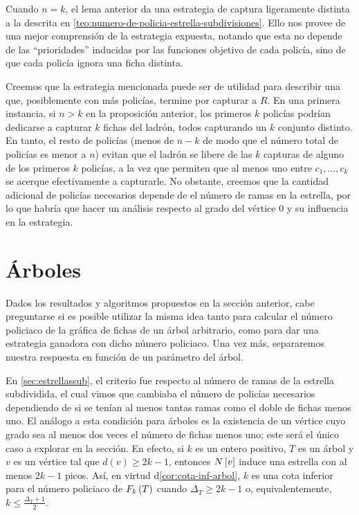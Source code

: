 Cuando $n=k$, el lema anterior da una estrategia de captura ligeramente distinta
a la descrita en \cref{teo:numero-de-policia-estrella-subdivisiones}. Ello nos
provee de una mejor comprensi\'on de la estrategia expuesta, notando que esta no
depende de las ``prioridades'' inducidas por las funciones objetivo de cada
polic\'ia, sino de que cada polic\'ia ignora una ficha distinta.

Creemos que la estrategia mencionada puede ser de utilidad para describir una
que, posiblemente con m\'as polic\'ias, termine por capturar a $R$. En una
primera instancia, si $n>k$ en la proposici\'on anterior, los primeros $k$
polic\'ias podr\'ian dedicarse a capturar $k$ fichas del ladr\'on, todos
capturando un $k$ conjunto distinto. En tanto, el resto de polic\'ias (menos de
$n-k$ de modo que el n\'umero total de polic\'ias es menor a $n$) evitan que el
ladr\'on se libere de las $k$ capturas de alguno de los primeros $k$ polic\'ias,
a la vez que permiten que al menos uno entre $c_1,\dots, c_k$ se acerque
efectivamente a capturarle. No obstante, creemos que la cantidad adicional de
polic\'ias necesarios depende de el n\'umero de ramas en la estrella, por lo que
habr\'ia que hacer un an\'alisis respecto al grado del v\'ertice $0$ y su
influencia en la estrategia.

\section{\'Arboles}
\label{sec:arboles}

Dados los resultados y algoritmos propuestos en la secci\'on anterior, cabe
preguntarse si es posible utilizar la misma idea tanto para calcular el n\'umero
policiaco de la gr\'afica de fichas de un \'arbol arbitrario, como para dar una
estrategia ganadora con dicho n\'umero policiaco. Una vez m\'as, separaremos
nuestra respuesta en funci\'on de un par\'ametro del \'arbol.

En \cref{sec:estrellassub}, el criterio fue respecto al n\'umero de ramas de la
estrella subdividida, el cual vimos que cambiaba el n\'umero de polic\'ias
necesarios dependiendo de si se ten\'ian al menos tantas ramas como el doble de
fichas menos uno. El an\'alogo a esta condici\'on para \'arboles es la
existencia de un v\'ertice cuyo grado sea al menos dos veces el n\'umero de
fichas menos uno; este ser\'a el \'unico caso a explorar en la secci\'on. En
efecto, si $k$ es un entero positivo, $T$ es un \'arbol y $v$ es un v\'ertice
tal que $d(v)\geq 2k-1$, entonces $N\left[ v\right]$ induce una estrella con al menos
$2k-1$ picos. As\'i, en virtud d\cref{cor:cota-inf-arbol}, $k$ es una cota
inferior para el n\'umero policiaco de $F_{k}\left( T\right)$ cuando $\Delta_T\geq 2k-1$ o,
equivalentemente, $k\leq \frac{\Delta_T + 1}{2}$.

